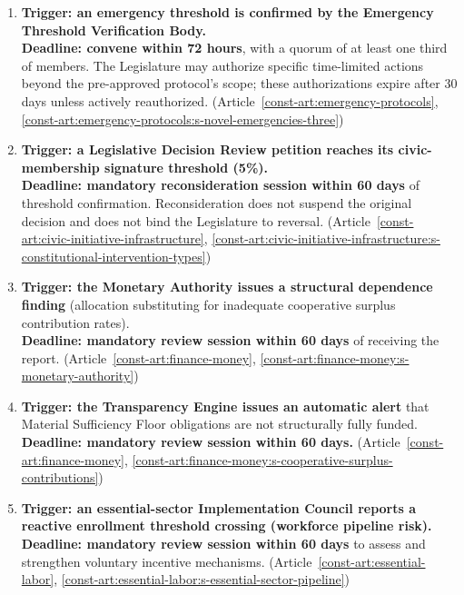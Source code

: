\documentclass[11pt]{article}
\begin{document}
\begin{enumerate}

  \item \textbf{Trigger: an emergency threshold is confirmed by the Emergency Threshold Verification Body.}
  \\ \textbf{Deadline: convene within 72 hours}, with a quorum of at least one third of members. The Legislature may authorize specific time-limited actions beyond the pre-approved protocol's scope; these authorizations expire after 30 days unless actively reauthorized. (Article~\ref{const-art:emergency-protocols}, \ref{const-art:emergency-protocols:s-novel-emergencies-three})

  \item \textbf{Trigger: a Legislative Decision Review petition reaches its civic-membership signature threshold (5\%).}
  \\ \textbf{Deadline: mandatory reconsideration session within 60 days} of threshold confirmation. Reconsideration does not suspend the original decision and does not bind the Legislature to reversal. (Article~\ref{const-art:civic-initiative-infrastructure}, \ref{const-art:civic-initiative-infrastructure:s-constitutional-intervention-types})

  \item \textbf{Trigger: the Monetary Authority issues a structural dependence finding} (allocation substituting for inadequate cooperative surplus contribution rates).
  \\ \textbf{Deadline: mandatory review session within 60 days} of receiving the report. (Article~\ref{const-art:finance-money}, \ref{const-art:finance-money:s-monetary-authority})

  \item \textbf{Trigger: the Transparency Engine issues an automatic alert} that Material Sufficiency Floor obligations are not structurally fully funded.
  \\ \textbf{Deadline: mandatory review session within 60 days.} (Article~\ref{const-art:finance-money}, \ref{const-art:finance-money:s-cooperative-surplus-contributions})

  \item \textbf{Trigger: an essential-sector Implementation Council reports a reactive enrollment threshold crossing (workforce pipeline risk).}
  \\ \textbf{Deadline: mandatory review session within 60 days} to assess and strengthen voluntary incentive mechanisms. (Article~\ref{const-art:essential-labor}, \ref{const-art:essential-labor:s-essential-sector-pipeline})


\end{enumerate}
\end{document}
